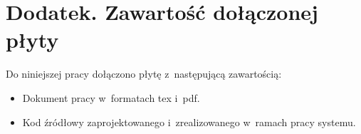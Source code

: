 \documentclass{PracaDyplomowa-Szablon}
\begin{document}
\chapter*{Dodatek. Zawartość dołączonej płyty}

Do niniejszej pracy dołączono płytę z~następującą zawartością:

\begin{itemize}
\item Dokument pracy w~formatach tex i~pdf.

\item Kod źródłowy zaprojektowanego i~zrealizowanego w~ramach pracy systemu.
\end{itemize}

\oswiadczenie %
\end{document}
